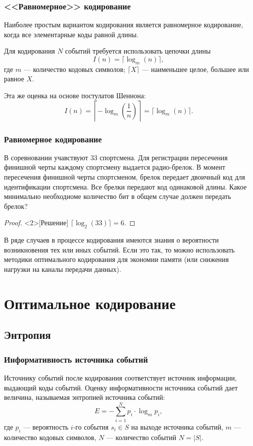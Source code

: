 \begin{frame}
    \frametitle{<<Равномерное>> кодирование}
    
    Наиболее простым вариантом кодирования является \alert{равномерное} кодирование, когда все элементарные коды равной длины.
    
    Для кодирования $N$ событий требуется использовать цепочки длины
    \[
        I(n)=\lceil\log_m(n)\rceil,
    \]
    где $m$ --- количество кодовых символов; $\lceil X \rceil$ --- наименьшее целое, большее или равное $X$.
    
    Эта же оценка на основе постулатов Шеннона:
    \[
        I(n)=\left\lceil -\log_m\left(\frac{1}{n}\right) \right\rceil=\lceil \log_m(n) \rceil.
    \]
\end{frame}

\begin{frame}
    \frametitle{Равномерное кодирование}

    \begin{example}
        В соревновании учавствуют $33$ спортсмена. Для регистрации пересечения финишной черты каждому спортсмену выдается радио-брелок. В момент пересечения финишной черты спортсменом, брелок передает двоичный код для идентификации спортсмена. Все брелки передают код одинаковой длины. Какое минимально необходиоме количество бит в общем случае должен передать брелок?
    \end{example}
    \begin{proof}<2>[Решение] 
        $\lceil \log_2(33)\rceil = 6$.
    \end{proof}
\end{frame}

В ряде случаев в процессе кодирования имеются знания о вероятности возникновения тех или иных событий. Если это так, то можно использовать методики оптимального кодирования для экономии памяти (или снижения нагрузки на каналы передачи данных).


\section{Оптимальное кодирование}

\subsection{Энтропия}

\begin{frame}
    \frametitle{Информативность источника \alert{событий}}
    
    Источнику событий после кодирования соответствует источник информации, выдающий коды событий. Оценку информативности \alert{источника событий} дает величина, называемая \alert{энтропией} источника событий:
    \begin{equation}
        \label{eq:code:entrophyS}
        E=-\sum_{i=1}^N {p_i\cdot\log_m p_i},
    \end{equation}
    где $p_i$ --- вероятность $i$-го события $s_i\in S$ на выходе источника событий, $m$ --- количество кодовых символов, $N$ --- количество событий $N=|S|$.
\end{frame}

